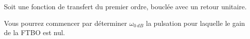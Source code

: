 
\setcounter{exo}{0}

Soit une fonction de transfert du premier ordre, bouclée avec un retour unitaire.




\ifprof
\begin{corrige}
\end{corrige}
\else
\fi



\ifprof
\begin{corrige}
\end{corrige}
\else
\fi

Vous pourrez commencer par déterminer $\omega_{\SI{0}{dB}}$ la pulsation pour laquelle le gain de la FTBO est nul.

